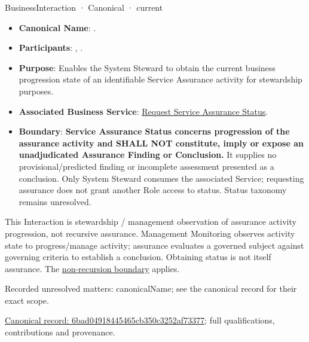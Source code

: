 \label{element:6bad04918445465cb350c3252af73377}
{\small BusinessInteraction · Canonical · current}\par

\begin{itemize}


\item \textbf{Canonical Name}: \texttt{}.

\item \textbf{Participants}: \texttt{}, \texttt{}.

\item \textbf{Purpose}: Enables the System Steward to obtain the current business progression state of an identifiable Service Assurance activity for stewardship purposes.

\item \textbf{Associated Business Service}: \href{\detokenize{../../../../../docs/markdown/03-business-architecture/behaviours/health-service-assurance.md#request-service-assurance-status}}{Request Service Assurance Status}.

\item \textbf{Boundary}: \textbf{Service Assurance Status concerns progression of the assurance activity and SHALL NOT constitute, imply or expose an unadjudicated Assurance Finding or Conclusion.} It supplies no provisional/predicted finding or incomplete assessment presented as a conclusion. Only System Steward consumes the associated Service; requesting assurance does not grant another Role access to status. Status taxonomy remains unresolved.

\end{itemize}


This Interaction is stewardship / management observation of assurance activity progression, not recursive assurance. Management Monitoring observes activity state to progress/manage activity; assurance evaluates a governed subject against governing criteria to establish a conclusion. Obtaining status is not itself assurance. The \href{\detokenize{../../../../../docs/markdown/03-business-architecture/behaviours/health-service-assurance.md#assurance-non-recursion-boundary}}{non-recursion boundary} applies.


{\small Recorded unresolved matters: canonicalName; see the canonical record for their exact scope.}\par
{\footnotesize \href{../../../../continuum/business/business-interaction/6bad04918445465cb350c3252af73377.md}{Canonical record: 6bad04918445465cb350c3252af73377}; full qualifications, contributions and provenance.}\par
